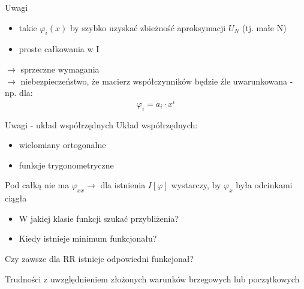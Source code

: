 
	\begin{frame}{Uwagi}
		\begin{itemize}
			\item takie $\varphi_i(x)$ by szybko uzyskać zbieżność aproksymacji $U_N$ (tj. małe N)
			\item proste całkowania w I
		\end{itemize}
		
		$\rightarrow$ sprzeczne wymagania \\
		$\rightarrow$ niebezpieczeństwo, że macierz współczynników będzie źle uwarunkowana - np. dla:
		$$
		\varphi_i = a_i \cdot x^i
		$$
	
	\end{frame}

	
	\begin{frame}{Uwagi - układ współrzędnych}
		Układ współrzędnych:
		\begin{itemize}
			\item wielomiany ortogonalne
			\item funkcje trygonometryczne
		\end{itemize}
		
		
		Pod całką nie ma $\varphi_{xx} \rightarrow$ dla istnienia $I[\varphi]$ wystarczy, by $\varphi_x$ była odcinkami ciągła
		\begin{itemize}
			\item W jakiej klasie funkcji szukać przybliżenia?	
			\item Kiedy istnieje minimum funkcjonału?
		\end{itemize}	
		
		Czy zawsze dla RR istnieje odpowiedni funkcjonał?
		
		Trudności z uwzględnieniem złożonych warunków brzegowych lub początkowych
	\end{frame}


